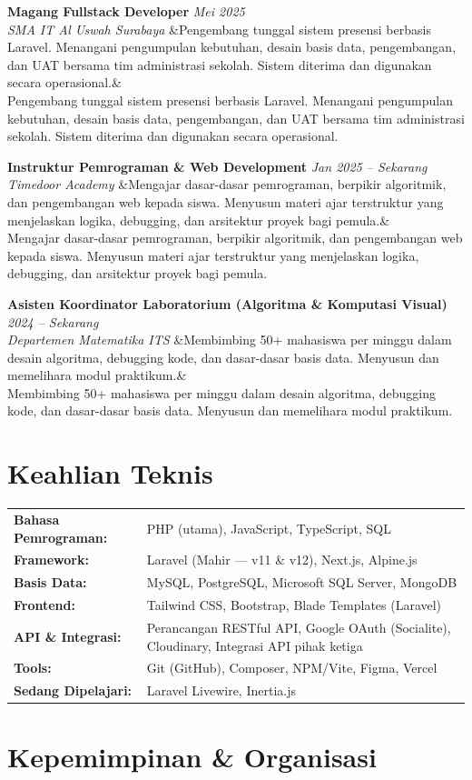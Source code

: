\documentclass[a4paper,11pt]{article}
\newcommand{\cventry}[4]{%
  \noindent\textbf{#1} \hfill \textit{#3} \\
  \textit{#2}
  \ifx&#4& \else \\ \small #4 \fi
  \vspace{6pt}
}
\begin{document}
\cventry
  {Magang Fullstack Developer}
  {SMA IT Al Uswah Surabaya}
  {Mei 2025}
  {Pengembang tunggal sistem presensi berbasis Laravel. Menangani pengumpulan kebutuhan, desain basis data, pengembangan, dan UAT bersama tim administrasi sekolah. Sistem diterima dan digunakan secara operasional.}

\cventry
  {Instruktur Pemrograman \& Web Development}
  {Timedoor Academy}
  {Jan 2025 -- Sekarang}
  {Mengajar dasar-dasar pemrograman, berpikir algoritmik, dan pengembangan web kepada siswa. Menyusun materi ajar terstruktur yang menjelaskan logika, debugging, dan arsitektur proyek bagi pemula.}

\cventry
  {Asisten Koordinator Laboratorium (Algoritma \& Komputasi Visual)}
  {Departemen Matematika ITS}
  {2024 -- Sekarang}
  {Membimbing 50+ mahasiswa per minggu dalam desain algoritma, debugging kode, dan dasar-dasar basis data. Menyusun dan memelihara modul praktikum.}

\section{Keahlian Teknis}

\begin{tabularx}{\textwidth}{@{}l X@{}}
\textbf{Bahasa Pemrograman:} & PHP (utama), JavaScript, TypeScript, SQL \\[3pt]
\textbf{Framework:} & Laravel (Mahir --- v11 \& v12), Next.js, Alpine.js \\[3pt]
\textbf{Basis Data:} & MySQL, PostgreSQL, Microsoft SQL Server, MongoDB \\[3pt]
\textbf{Frontend:} & Tailwind CSS, Bootstrap, Blade Templates (Laravel) \\[3pt]
\textbf{API \& Integrasi:} & Perancangan RESTful API, Google OAuth (Socialite), Cloudinary, Integrasi API pihak ketiga \\[3pt]
\textbf{Tools:} & Git (GitHub), Composer, NPM/Vite, Figma, Vercel \\[3pt]
\textbf{Sedang Dipelajari:} & Laravel Livewire, Inertia.js \\
\end{tabularx}

\section{Kepemimpinan \& Organisasi}
\end{document}
